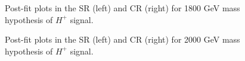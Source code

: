 \begin{figure}[H]
  \centering
  \caption{Post-fit plots in the SR (left) and CR (right) for 1800 GeV mass hypothesis of $H^{+}$ signal.}
  \label{fig:Postfit_Hp1000_Asimov}
\end{figure}
\begin{figure}[H]
  \centering
  \caption{Post-fit plots in the SR (left) and CR (right) for 2000 GeV mass hypothesis of $H^{+}$ signal.}
  \label{fig:Postfit_Hp1000_Asimov}
\end{figure}
